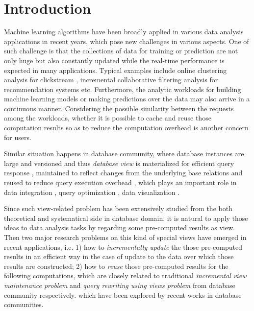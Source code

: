 \section{Introduction}

Machine learning algorithms have been broadly applied in various data analysis applications in recent years, which pose new challenges in various aspects. One of such challenge is that the collections of data for training or prediction are not only huge but also constantly updated while the real-time performance is expected in many applications. Typical examples include online clustering analysis for clickstream \cite{guha2000clustering}, incremental collaborative filtering analysis for recommendation systems \cite{papagelis2005incremental} etc. Furthermore, the analytic workloads for building machine learning models or making predictions over the data may also arrive in a continuous manner. Considering the possible similarity between the requests among the workloads, whether it is possible to cache and reuse those computation results so as to reduce the computation overhead is another concern for users.

Similar situation happens in database community, where database instances are large and versioned and thus {\em database view} is materialized for efficient query response \cite{date2006relational}, maintained to reflect changes from the underlying base relations \cite{gupta1993maintaining, green2007update} and reused to reduce query execution overhead \cite{halevy2001answering}, which plays an important role in data integration \cite{levy1996querying}, query optimization \cite{rajaraman1995answering}, data visualization \cite{brachman1993integrated}. 

Since such view-related problem has been extensively studied from the both theoretical and systematical side in database domain,  it is natural to apply those ideas to data analysis tasks by regarding some pre-computed results as view. Then two major research problems on this kind of special views have emerged in recent applications, i.e. 1) how to {\em incrementally update} the those pre-computed results in an efficient way in the case of update to the data over which those results are constructed; 2) how to {\em reuse} those pre-computed results for the following computations, which are closely related to traditional {\em incremental view maintenance problem} and {\em query rewriting using views problem} from database community respectively. which have been explored by recent works in database communities. 


